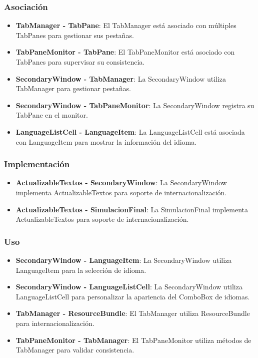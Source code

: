 \subsubsection{Asociación}
\begin{itemize}
    \item \textbf{TabManager - TabPane}: El TabManager está asociado con múltiples TabPanes para gestionar sus pestañas.
    \item \textbf{TabPaneMonitor - TabPane}: El TabPaneMonitor está asociado con TabPanes para supervisar su consistencia.
    \item \textbf{SecondaryWindow - TabManager}: La SecondaryWindow utiliza TabManager para gestionar pestañas.
    \item \textbf{SecondaryWindow - TabPaneMonitor}: La SecondaryWindow registra su TabPane en el monitor.
    \item \textbf{LanguageListCell - LanguageItem}: La LanguageListCell está asociada con LanguageItem para mostrar la información del idioma.
\end{itemize}

\subsubsection{Implementación}
\begin{itemize}
    \item \textbf{ActualizableTextos - SecondaryWindow}: La SecondaryWindow implementa ActualizableTextos para soporte de internacionalización.
    \item \textbf{ActualizableTextos - SimulacionFinal}: La SimulacionFinal implementa ActualizableTextos para soporte de internacionalización.
\end{itemize}

\subsubsection{Uso}
\begin{itemize}
    \item \textbf{SecondaryWindow - LanguageItem}: La SecondaryWindow utiliza LanguageItem para la selección de idioma.
    \item \textbf{SecondaryWindow - LanguageListCell}: La SecondaryWindow utiliza LanguageListCell para personalizar la apariencia del ComboBox de idiomas.
    \item \textbf{TabManager - ResourceBundle}: El TabManager utiliza ResourceBundle para internacionalización.
    \item \textbf{TabPaneMonitor - TabManager}: El TabPaneMonitor utiliza métodos de TabManager para validar consistencia.
\end{itemize}

